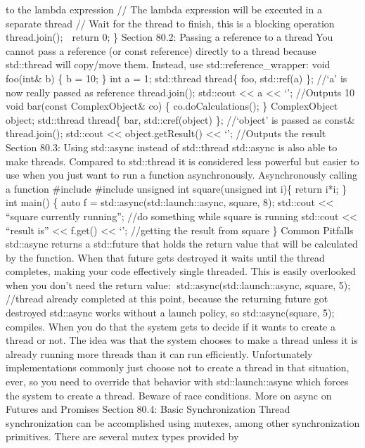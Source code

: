 to the lambda expression // The lambda expression will be executed in a
separate thread // Wait for the thread to finish, this is a blocking
operation thread.join();  return 0; \} Section 80.2: Passing a
reference to a thread You cannot pass a reference (or const reference)
directly to a thread because std::thread will copy/move them. Instead,
use std::reference\_wrapper: void foo(int\& b) \{ b = 10; \} int a = 1;
std::thread thread\{ foo, std::ref(a) \}; //`a' is now really passed as
reference thread.join(); std::cout \textless\textless{} a
\textless\textless{} `\n'; //Outputs 10 void bar(const ComplexObject\&
co) \{ co.doCalculations(); \} ComplexObject object; std::thread
thread\{ bar, std::cref(object) \}; //`object' is passed as const\&
thread.join(); std::cout \textless\textless{} object.getResult()
\textless\textless{} `\n'; //Outputs the result Section 80.3: Using
std::async instead of std::thread std::async is also able to make
threads. Compared to std::thread it is considered less powerful but
easier to use when you just want to run a function asynchronously.
Asynchronously calling a function \#include \#include unsigned int
square(unsigned int i)\{ return i*i; \} int main() \{ auto f =
std::async(std::launch::async, square, 8); std::cout
\textless\textless{} ``square currently running\n''; //do something
while square is running std::cout \textless\textless{} ``result is''
\textless\textless{} f.get() \textless\textless{} `\n'; //getting the
result from square \} Common Pitfalls std::async returns a std::future
that holds the return value that will be calculated by the function.
When that future gets destroyed it waits until the thread completes,
making your code eﬀectively single threaded. This is easily overlooked
when you don't need the return value: std::async(std::launch::async,
square, 5); //thread already completed at this point, because the
returning future got destroyed std::async works without a launch policy,
so std::async(square, 5); compiles. When you do that the system gets to
decide if it wants to create a thread or not. The idea was that the
system chooses to make a thread unless it is already running more
threads than it can run eﬃciently. Unfortunately implementations
commonly just choose not to create a thread in that situation, ever, so
you need to override that behavior with std::launch::async which forces
the system to create a thread. Beware of race conditions. More on async
on Futures and Promises Section 80.4: Basic Synchronization Thread
synchronization can be accomplished using mutexes, among other
synchronization primitives. There are several mutex types provided by
